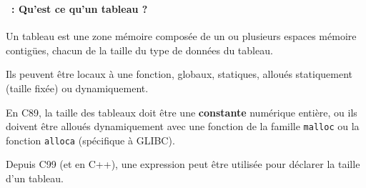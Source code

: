 \begin{frame}%
  \frametitle{\secname}
  \framesubtitle{\subsecname~: Qu'est ce qu'un tableau ?}

  Un tableau est une zone mémoire composée de un ou plusieurs espaces mémoire contigües, chacun de la taille du type de données du tableau.
  \vspace{0.3cm}
  \par
  Ils peuvent être locaux à une fonction, globaux, statiques, alloués statiquement (taille fixée) ou dynamiquement.
  \vspace{0.3cm}
  \par
  En C89, la taille des tableaux doit être une \textbf{constante} numérique entière, ou ils doivent être alloués dynamiquement avec 
  une fonction de la famille \texttt{malloc} ou la fonction \texttt{alloca} (spécifique à GLIBC). 
  \vspace{0.3cm}
  \par
  Depuis C99 (et en C++), une expression peut être utilisée pour déclarer la taille d'un tableau.
\end{frame}

